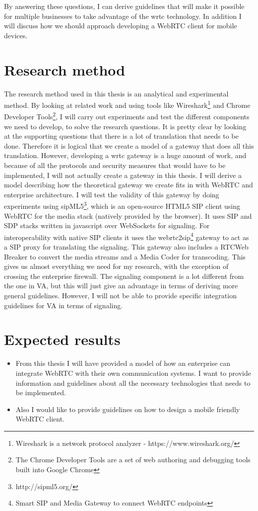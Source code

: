 By answering these questions, I can derive guidelines that will make it possible for multiple businesses to take advantage of the \gls{wrtc} technology. In addition I will discuss how we should approach developing a WebRTC client for mobile devices.


\section{Research method}
The research method used in this thesis is an analytical and experimental method. By looking at related work and using tools like Wireshark\footnote{Wireshark is a network protocol analyzer - https://www.wireshark.org/} and Chrome Developer Tools\footnote{The Chrome Developer Tools are a set of web authoring and debugging tools built into Google Chrome}, I will carry out experiments and test the different components we need to develop, to solve the research questions. It is pretty clear by looking at the supporting questions that there is a lot of translation that needs to be done. Therefore it is logical that we create a model of a gateway that does all this translation. However, developing a \gls{wrtc} gateway is a huge amount of work, and because of all the protocols and security measures that would have to be implemented, I will not actually create a gateway in this thesis. I will derive a model describing how the theoretical gateway we create fits in with WebRTC and enterprise architecture. I will test the validity of this gateway by doing experiments using sipML5\footnote{http://sipml5.org/}, which is an open-source HTML5 SIP client using WebRTC for the media stack (natively provided by the browser). It uses SIP and SDP stacks written in javascript over WebSockets for signaling. For interoperability with native SIP clients it uses the webrtc2sip\footnote{Smart SIP and Media Gateway to connect WebRTC endpoints} gateway to act as a SIP proxy for translating the signaling. This gateway also includes a RTCWeb Breaker to convert the media streams and a Media Coder for transcoding. This gives us almost everything we need for my research, with the exception of crossing the enterprise firewall. The signaling component is a lot different from the one in VA, but this will just give an advantage in terms of deriving more general guidelines. However, I will not be able to provide specific integration guidelines for VA in terms of signaling.

\section{Expected results}

\begin{itemize}
    \item From this thesis I will have provided a model of how an enterprise can integrate WebRTC with their own communication systems. I want to provide information and guidelines about all the necessary technologies that needs to be implemented.
    \item Also I would like to provide guidelines on how to design a mobile friendly WebRTC client.
\end{itemize}
